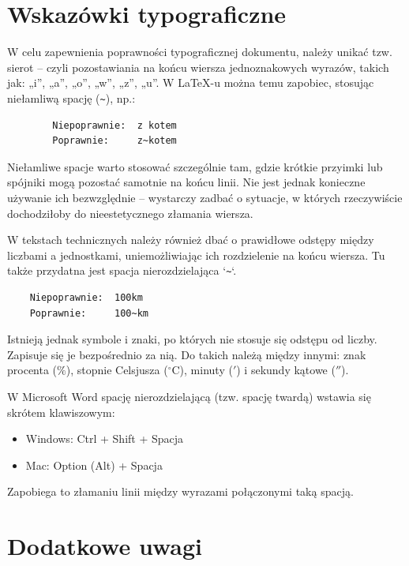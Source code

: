 \documentclass[12pt,a4paper,twoside]{report}
\theoremstyle{definition} %
\begin{document}
    \section{Wskazówki typograficzne}

    W celu zapewnienia poprawności typograficznej dokumentu, należy unikać tzw. sierot – czyli pozostawiania na końcu wiersza jednoznakowych wyrazów, takich jak: „i”, „a”, „o”, „w”, „z”, „u”. W LaTeX-u można temu zapobiec, stosując niełamliwą spację (\verb|~|), np.:

    \begin{verbatim}
        Niepoprawnie:  z kotem
        Poprawnie:     z~kotem
    \end{verbatim}

    Niełamliwe spacje warto stosować szczególnie tam, gdzie krótkie przyimki lub spójniki mogą pozostać samotnie na końcu linii. Nie jest jednak konieczne używanie ich bezwzględnie – wystarczy zadbać o sytuacje, w których rzeczywiście dochodziłoby do nieestetycznego złamania wiersza.

    W tekstach technicznych należy również dbać o prawidłowe odstępy między liczbami a jednostkami, uniemożliwiając ich rozdzielenie na końcu wiersza. Tu także przydatna jest spacja nierozdzielająca `\verb|~|`. 

    \begin{verbatim}
    Niepoprawnie:  100km
    Poprawnie:     100~km
    \end{verbatim}
    
Istnieją jednak symbole i znaki, po których nie stosuje się odstępu od liczby. Zapisuje się je bezpośrednio za nią. Do takich należą między innymi: znak procenta ($\%$), stopnie Celsjusza ($^\circ$C), minuty ($'$) i sekundy kątowe ($''$).

W Microsoft Word spację nierozdzielającą (tzw. spację twardą) wstawia się skrótem klawiszowym:

\begin{itemize}
    \item Windows: Ctrl + Shift + Spacja
    \item Mac: Option (Alt) + Spacja
\end{itemize}

 Zapobiega to złamaniu linii między wyrazami połączonymi taką spacją.



\section{Dodatkowe uwagi}
\end{document}
